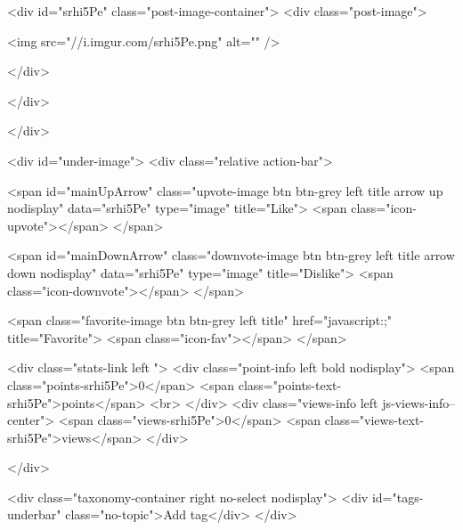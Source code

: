                     

                    <div id="srhi5Pe" class="post-image-container">
                        <div class="post-image">
    

                        <img src="//i.imgur.com/srhi5Pe.png" alt="" />
        
    
</div>


                        
                    </div>
                

                

                
                </div>

                <div id="under-image">
                    <div class="relative action-bar">

    <span id="mainUpArrow" class="upvote-image btn btn-grey left title arrow up nodisplay" data="srhi5Pe" type="image" title="Like">
        <span class="icon-upvote"></span>
    </span>

    <span id="mainDownArrow" class="downvote-image btn btn-grey left title arrow down nodisplay" data="srhi5Pe" type="image" title="Dislike">
        <span class="icon-downvote"></span>
    </span>

    <span class="favorite-image btn btn-grey left title" href="javascript:;" title="Favorite">
        <span class="icon-fav"></span>
    </span>

    <div class="stats-link left ">
                    <div class="point-info left bold nodisplay">
                <span class="points-srhi5Pe">0</span>
                <span class="points-text-srhi5Pe">points</span>
                <br>
            </div>
            <div class="views-info left js-views-info--center">
                <span class="views-srhi5Pe">0</span>
                <span class="views-text-srhi5Pe">views</span>
            </div>
        

        
                    
        

    </div>

    <div class="taxonomy-container right no-select nodisplay">
        <div id="tags-underbar" class="no-topic">Add tag</div>
    </div>

